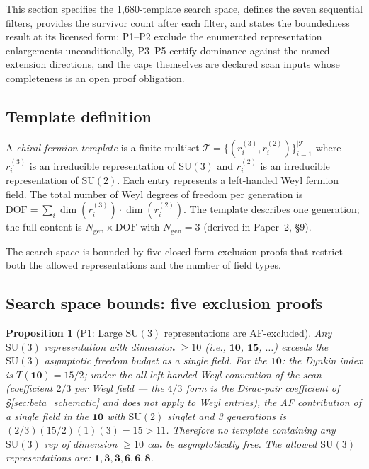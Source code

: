 \documentclass[11pt]{article}
\newtheorem{proposition}[theorem]{Proposition}
\theoremstyle{definition}
\newcommand{\SU}{\mathrm{SU}}
\begin{document}
This section specifies the 1{,}680-template search space, defines the
seven sequential filters, provides the survivor count after each
filter, and states the boundedness result at its licensed form:
P1--P2 exclude the enumerated representation enlargements
unconditionally, P3--P5 certify dominance against the named extension
directions, and the caps themselves are declared scan inputs whose
completeness is an open proof obligation.


\subsection{Template definition}
\label{sec:template_def}

A \emph{chiral fermion template} is a finite multiset
$\mathcal{T} = \{(r_i^{(3)}, r_i^{(2)})\}_{i=1}^{|\mathcal{T}|}$
where $r_i^{(3)}$ is an irreducible representation of $\SU(3)$ and
$r_i^{(2)}$ is an irreducible representation of $\SU(2)$.  Each entry
represents a left-handed Weyl fermion field.  The total number of Weyl
degrees of freedom per generation is
$\mathrm{DOF} = \sum_i \dim(r_i^{(3)}) \cdot \dim(r_i^{(2)})$.
The template describes one generation; the full content is
$N_{\mathrm{gen}} \times \mathrm{DOF}$ with $N_{\mathrm{gen}} = 3$
(derived in Paper~2, \S9).

The search space is bounded by five closed-form exclusion proofs that
restrict both the allowed representations and the number of field types.


\subsection{Search space bounds: five exclusion proofs}
\label{sec:exclusion_proofs}

\begin{proposition}[P1: Large $\SU(3)$ representations are AF-excluded]
\label{prop:P1}
Any $\SU(3)$ representation with dimension $\ge 10$ (i.e.,
$\mathbf{10}$, $\mathbf{15}$, $\ldots$) exceeds the $\SU(3)$
asymptotic freedom budget as a single field.  For the $\mathbf{10}$:
the Dynkin index is $T(\mathbf{10}) = 15/2$; under the all-left-handed
Weyl convention of the scan (coefficient $2/3$ per Weyl field --- the
$4/3$ form is the Dirac-pair coefficient of \S\ref{sec:beta_schematic}
and does not apply to Weyl entries), the AF contribution of a single
field in the $\mathbf{10}$ with $\SU(2)$ singlet and 3 generations is
$(2/3)(15/2)(1)(3) = 15 > 11$.
Therefore no template containing any $\SU(3)$ rep of dimension
$\ge 10$ can be asymptotically free.  The allowed $\SU(3)$
representations are: $\mathbf{1}, \mathbf{3}, \bar{\mathbf{3}},
\mathbf{6}, \bar{\mathbf{6}}, \mathbf{8}$.
\end{proposition}
\end{document}
